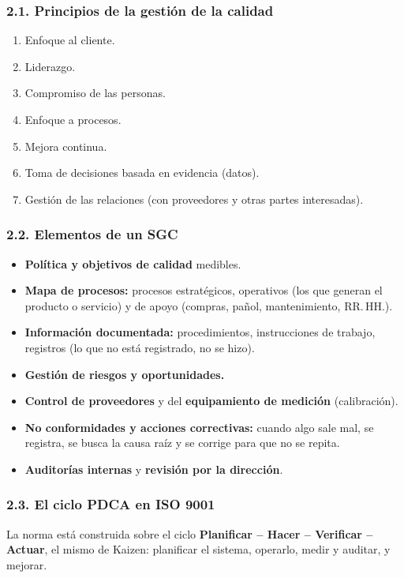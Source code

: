 \subsubsection*{2.1. Principios de la gestión de la calidad}
\begin{enumerate}
  \item Enfoque al cliente.
  \item Liderazgo.
  \item Compromiso de las personas.
  \item Enfoque a procesos.
  \item Mejora continua.
  \item Toma de decisiones basada en evidencia (datos).
  \item Gestión de las relaciones (con proveedores y otras partes interesadas).
\end{enumerate}

\subsubsection*{2.2. Elementos de un SGC}
\begin{itemize}
  \item \textbf{Política y objetivos de calidad} medibles.
  \item \textbf{Mapa de procesos:} procesos estratégicos, operativos (los que generan el
        producto o servicio) y de apoyo (compras, pañol, mantenimiento, RR.\,HH.).
  \item \textbf{Información documentada:} procedimientos, instrucciones de trabajo,
        registros (lo que no está registrado, no se hizo).
  \item \textbf{Gestión de riesgos y oportunidades.}
  \item \textbf{Control de proveedores} y del \textbf{equipamiento de medición} (calibración).
  \item \textbf{No conformidades y acciones correctivas:} cuando algo sale mal, se registra,
        se busca la causa raíz y se corrige para que no se repita.
  \item \textbf{Auditorías internas} y \textbf{revisión por la dirección}.
\end{itemize}

\subsubsection*{2.3. El ciclo PDCA en ISO 9001}
La norma está construida sobre el ciclo \textbf{Planificar -- Hacer -- Verificar -- Actuar},
el mismo de Kaizen: planificar el sistema, operarlo, medir y auditar, y mejorar.

